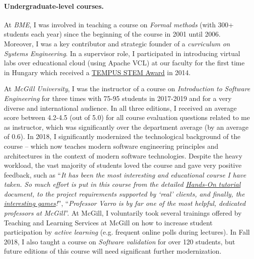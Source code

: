 \documentclass[a4paper,11pt]{article}
\begin{document}
\paragraph{Undergraduate-level courses.}
At \emph{BME}, I was involved in teaching a course on \emph{Formal methods} (with 300+ students each year) since the beginning of the course in 2001 until 2006. Moreover, I was a key contributor and strategic founder of a \emph{curriculum on Systems Engineering}. In a supervisor role, I participated in introducing virtual labs over educational cloud (using Apache VCL) at our faculty for the first time in Hungary which received a \href{https://inf.mit.bme.hu/en/news/2014/02/tempus-stem-call-apache-vcl-based-labs-won-prize}{TEMPUS STEM Award} in 2014. 

At \emph{McGill University}, I was the instructor of a course on \emph{Introduction to Software Engineering} for three times with 75-95 students in 2017-2019 and for a very diverse and international audience. In all three editions, I received an average score between 4.2-4.5 (out of 5.0) for all course evaluation questions related to me as instructor, which was significantly over the department average (by an average of 0.6). In 2018, I significantly modernized the technological background of the course – which now teaches modern software engineering principles and architectures in the context of modern software technologies. Despite the heavy workload, the vast majority of students loved the course and gave very positive feedback, such as “\emph{It has been the most interesting and educational course I have taken. So much effort is put in this course from the detailed \href{https://mcgill-ecse321-winter2019.github.io/EventRegistration-Tutorials/}{Hands-On tutorial} document, to the project requirements supported by ‘real’ clients, and finally, the \href{https://flipquiz.com/flashcards/82085/}{interesting games}!}”, “\emph{Professor Varro is by far one of the most helpful, dedicated professors at McGill}”. At McGill, I voluntarily took several trainings offered by Teaching and Learning Services at McGill on how to increase student participation by \emph{active learning} (e.g. frequent online polls during lectures). In Fall 2018, I also taught a course on \emph{Software validation} for over 120 students, but future editions of this course will need significant further modernization.
\end{document}
